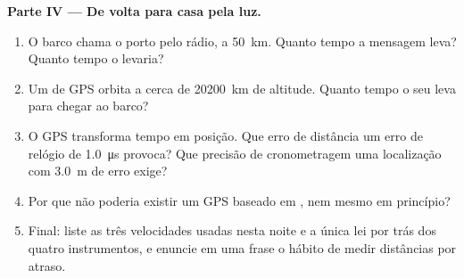 \begin{problem}
\medskip
\noindent\textbf{Parte IV --- De volta para casa pela luz.}
\begin{enumerate}[resume]
  \item O barco chama o porto pelo rádio, a \qty{50}{km}. Quanto tempo a
        mensagem leva? Quanto tempo o  levaria?
  \item Um  de GPS orbita a cerca de \qty{20200}{km} de altitude.
        Quanto tempo o seu  leva para chegar ao barco?
  \item O GPS transforma tempo em posição. Que erro de distância um erro
        de relógio de \qty{1.0}{\micro s} provoca? Que precisão de
        cronometragem uma localização com \qty{3.0}{m} de erro exige?
  \item Por que não poderia existir um GPS baseado em , nem mesmo em
        princípio?
  \item Final: liste as três velocidades usadas nesta noite e a única lei
        por trás dos quatro instrumentos, e enuncie em uma frase o hábito
        de medir distâncias por atraso.
\end{enumerate}
\end{problem}
